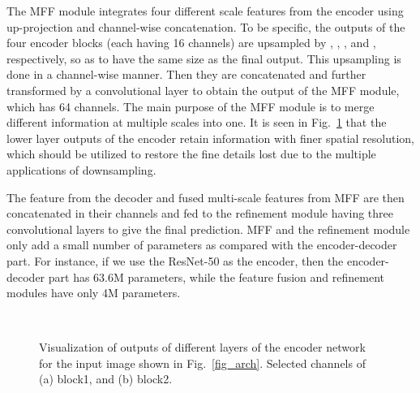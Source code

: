 \documentclass[10pt,twocolumn,letterpaper]{article}
\begin{document}
The MFF module integrates four different scale features from the encoder using up-projection and channel-wise concatenation. 
To be specific, the outputs of the four encoder blocks (each having 16 channels) are upsampled by , , , and , respectively, so as to have the same size as the final output. This upsampling is done in a channel-wise manner. Then they are concatenated and further transformed by a convolutional layer to obtain the output of the MFF module, which has 64 channels. The main purpose of the MFF module is to merge different information at multiple scales into one. 
It is seen in Fig.~\ref{fig_feature} that the lower layer outputs of the encoder retain information with finer spatial resolution, which should be utilized to restore the fine details lost due to the multiple applications of downsampling. 

\begin{comment}
Figure \ref{fig_feature} shows the outputs of block1 (1/2 scale) and block2 (1/4 scale) of the encoder. It is observed that they maintain finer details of object shapes. Thus, they can be used as complementary to small scale features to recover spatial resolution. We propose MFF which integrates four different scale features.
To be specific, the outputs of the four encoder blocks are upsampled by , , , and , respectively, so as to have the same size as the final output. Their outputs contain  channels. Then they are further fused with a convolutional layer. Thus, the outputs of MFF have only 64 channels.
Both decoder and MFF have four up-projection modules and one convolutional layer, but they work in a different way as shown in Fig.~\ref{fig_module}.  
\end{comment}

The feature from the decoder and fused multi-scale features from MFF are then concatenated in their channels and fed to the refinement module having three convolutional layers to give the final prediction. MFF and the refinement module only add a small number of parameters as compared with the encoder-decoder part. For instance, if we use the ResNet-50 as the encoder, then the encoder-decoder part has 63.6M parameters, while the feature fusion and refinement modules have only 4M parameters. 


\begin{figure}[!t]
\centering
{}~~\caption{Visualization of outputs of different layers of the encoder network for the input image shown in Fig.~\ref{fig_arch}. Selected channels of (a)  block1, and (b) block2.}
\label{fig_feature}
\end{figure}
\end{document}
